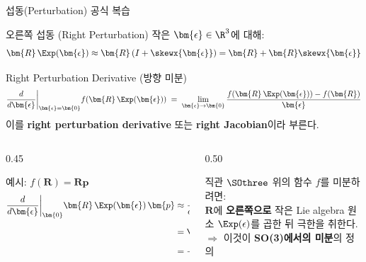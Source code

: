 \begin{frame}{섭동(Perturbation) 공식 복습}
  \begin{block}{오른쪽 섭동 (Right Perturbation)}
    작은 $\bm{\epsilon} \in \R^3$에 대해:
    \[
      \bm{R}\,\Exp(\bm{\epsilon}) \approx \bm{R}\,(I + \skewx{\bm{\epsilon}}) = \bm{R} + \bm{R}\skewx{\bm{\epsilon}}
    \]
  \end{block}
  \pause
  \begin{block}{Right Perturbation Derivative (방향 미분)}
    \[
      \frac{d}{d\bm{\epsilon}}\bigg|_{\bm{\epsilon}=\bm{0}} f\!\left(\bm{R}\,\Exp(\bm{\epsilon})\right)
      \;=\;
      \lim_{\bm{\epsilon}\to\bm{0}} \frac{f\!\left(\bm{R}\,\Exp(\bm{\epsilon})\right) - f(\bm{R})}{\bm{\epsilon}}
    \]
    이를 \textbf{right perturbation derivative} 또는 \textbf{right Jacobian}이라 부른다.
  \end{block}
  \pause
  \begin{columns}[T]
    \begin{column}{0.45\textwidth}
      \begin{exampleblock}{예시: $f(\bm{R}) = \bm{R}\bm{p}$}
        \begin{align*}
          \frac{d}{d\bm{\epsilon}}\bigg|_{\bm{0}} \bm{R}\,\Exp(\bm{\epsilon})\,\bm{p}
          &\approx \frac{d}{d\bm{\epsilon}} \bm{R}(I + \skewx{\bm{\epsilon}})\bm{p} \\
          &= \bm{R} \cdot \frac{d\skewx{\bm{\epsilon}}\bm{p}}{d\bm{\epsilon}} \\
          &= -\bm{R}\skewx{\bm{p}}
        \end{align*}
      \end{exampleblock}
    \end{column}
    \begin{column}{0.50\textwidth}
      \begin{alertblock}{직관}
        $\SOthree$ 위의 함수 $f$를 미분하려면:\\
        \medskip
        $\bm{R}$에 \textbf{오른쪽으로} 작은 Lie algebra 원소 $\Exp(\epsilon)$를 곱한 뒤 극한을 취한다.\\
        \medskip
        $\Rightarrow$ 이것이 \textbf{SO(3)에서의 미분}의 정의
      \end{alertblock}
    \end{column}
  \end{columns}
\end{frame}


